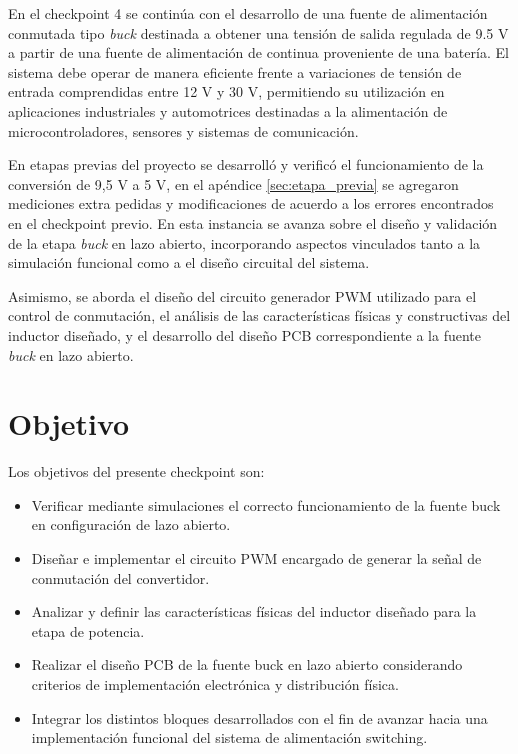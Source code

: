 \documentclass[]{article}
\begin{document}
	En el checkpoint 4 se continúa con el desarrollo de una fuente de alimentación conmutada tipo \textit{buck} destinada a obtener una tensión de salida regulada de 9.5 V a partir de una fuente de alimentación de continua proveniente de una batería. El sistema debe operar de manera eficiente frente a variaciones de tensión de entrada comprendidas entre 12 V y 30 V, permitiendo su utilización en aplicaciones industriales y automotrices destinadas a la alimentación de microcontroladores, sensores y sistemas de comunicación.
	
	En etapas previas del proyecto se desarrolló y verificó el funcionamiento de la conversión de 9,5 V a 5 V, en el apéndice \ref{sec:etapa_previa} se agregaron mediciones extra pedidas y modificaciones de acuerdo a los errores encontrados en el checkpoint previo. En esta instancia se avanza sobre el diseño y validación de la etapa \textit{buck} en lazo abierto, incorporando aspectos vinculados tanto a la simulación funcional como a el diseño circuital del sistema.
	
	Asimismo, se aborda el diseño del circuito generador PWM utilizado para el control de conmutación, el análisis de las características físicas y constructivas del inductor diseñado, y el desarrollo del diseño PCB correspondiente a la fuente \textit{buck} en lazo abierto.
	
	\section{Objetivo}
	Los objetivos del presente checkpoint son:
	
	\begin{itemize}
		\item Verificar mediante simulaciones el correcto funcionamiento de la fuente buck en configuración de lazo abierto.
		
		\item Diseñar e implementar el circuito PWM encargado de generar la señal de conmutación del convertidor.
		
		\item Analizar y definir las características físicas del inductor diseñado para la etapa de potencia.
		
		\item Realizar el diseño PCB de la fuente buck en lazo abierto considerando criterios de implementación electrónica y distribución física.
		
		\item Integrar los distintos bloques desarrollados con el fin de avanzar hacia una implementación funcional del sistema de alimentación switching.
	\end{itemize}
	
\end{document}
